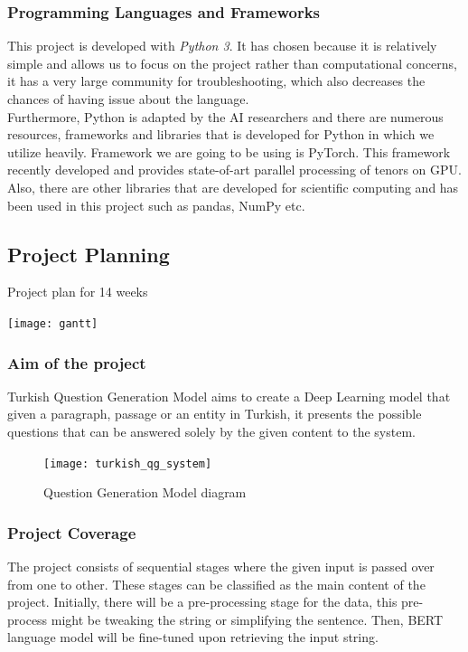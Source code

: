 \documentclass{mefsdp}
\begin{document}
	\subsubsection{Programming Languages and Frameworks}
	This project is developed with \textit{Python 3}. It has chosen because it is relatively simple and allows us to focus on the project rather than computational concerns, it has a very large community for troubleshooting, which also decreases the chances of having issue about the language.\\
	
	Furthermore, Python is adapted by the AI researchers and there are numerous resources, frameworks and libraries that is developed for Python in which we utilize heavily. Framework we are going to be using is PyTorch. This framework recently developed and provides state-of-art parallel processing of tenors on GPU. Also, there are other libraries that are developed for scientific computing and has been used in this project such as pandas, NumPy etc.\\
	
	\subsection{Project Planning}
	\begin{table}[ht!]
		\caption{Project plan for 14 weeks}
		\centering
		\texttt{[image: gantt]}
	\end{table}
	\newpage
	\subsubsection{Aim of the project}
	Turkish Question Generation Model aims to create a Deep Learning model that given a paragraph, passage or an entity in Turkish, it presents the possible questions that can be answered solely by the given content to the system.
	
	\begin{figure}[ht!]
		\centering
		\texttt{[image: turkish\_qg\_system]}
		\caption{Question Generation Model diagram}
	\end{figure}

	\subsubsection{Project Coverage}
	The project consists of sequential stages where the given input is passed over from one to other. These stages can be classified as the main content of the project. Initially, there will be a pre-processing stage for the data, this pre-process might be tweaking the string or simplifying the sentence. Then, BERT language model will be fine-tuned upon retrieving the input string.\\
	
\end{document}
